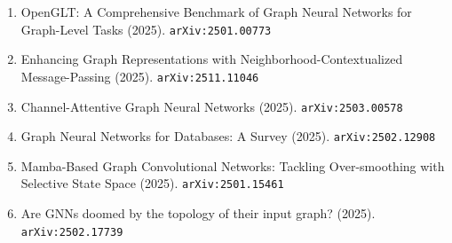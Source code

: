 \documentclass[11pt]{article}
\begin{document}
\begin{enumerate}
  graph-aware logistic regression (2024). \texttt{arXiv:2411.12330}
  \item OpenGLT: A Comprehensive Benchmark of Graph Neural Networks for Graph-Level Tasks (2025). \texttt{arXiv:2501.00773}
  \item Enhancing Graph Representations with Neighborhood-Contextualized Message-Passing (2025). \texttt{arXiv:2511.11046}
  \item Channel-Attentive Graph Neural Networks (2025). \texttt{arXiv:2503.00578}
  \item Graph Neural Networks for Databases: A Survey (2025). \texttt{arXiv:2502.12908}
  \item Mamba-Based Graph Convolutional Networks: Tackling Over-smoothing with Selective State Space (2025). \texttt{arXiv:2501.15461}
  \item Are GNNs doomed by the topology of their input graph? (2025). \texttt{arXiv:2502.17739}
\end{enumerate}
\end{document}
